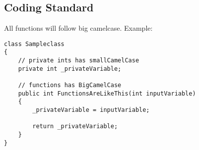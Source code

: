 \subsection{Coding Standard}
\label{subsec:coding_standard}

All functions will follow big camelcase. Example:

\begin{lstlisting}[style=sourceCode, caption=\myCaption{Sampleclass.cs}, label=lst:sampleclas]
class Sampleclass
{
    // private ints has smallCamelCase
    private int _privateVariable;

    // functions has BigCamelCase
    public int FunctionsAreLikeThis(int inputVariable)
    {
        _privateVariable = inputVariable;

        return _privateVariable;
    }
}
\end{lstlisting}